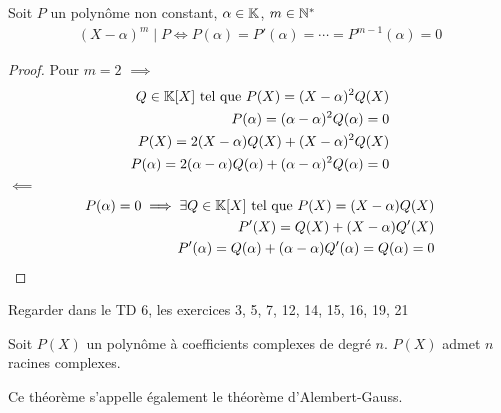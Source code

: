 \begin{graybox}
\begin{theoreme}
Soit $P$ un polynôme non constant, $\alpha \in \mathbb{K}$, $m \in \mathbb{N}^*$
\begin{align*}
(X - \alpha)^m \mid P \iff P(\alpha) = P'(\alpha) = \cdots = P^{m-1}(\alpha) = 0
\end{align*}
\end{theoreme}
\end{graybox}

\begin{proof} Pour $m = 2$
$\implies$
\begin{align*}
Q \in \mathbb{K} [X] \text{ tel que } P(X) = (X - \alpha)^2 Q(X) \\
P(\alpha) = (\alpha - \alpha)^2 Q(\alpha) = 0 \\
P(X) = 2(X - \alpha) Q(X) + (X - \alpha)^2 Q(X) \\
P(\alpha) = 2 (\alpha - \alpha) Q(\alpha) + (\alpha - \alpha)^2 Q(\alpha) = 0
\end{align*}
$\impliedby$
\begin{align*}
P(\alpha) = 0 \implies \exists Q \in \mathbb{K}[X] \text{ tel que } P(X) = (X - \alpha) Q(X) \\
P'(X) = Q(X) + (X - \alpha)Q'(X) \\
P'(\alpha) = Q(\alpha) + (\alpha - \alpha) Q'(\alpha) = Q(\alpha) = 0
\end{align*}
\end{proof}

\begin{remarque}
Regarder dans le TD 6, les exercices 3, 5, 7, 12, 14, 15, 16, 19, 21
\end{remarque}

\begin{graybox}
\begin{theoreme}
Soit $P(X)$ un polynôme à coefficients complexes de degré $n$. $P(X)$ admet $n$ racines complexes. 
\end{theoreme}
\end{graybox}

\begin{remarque}
Ce théorème s'appelle également le théorème d'Alembert-Gauss.
\end{remarque}
